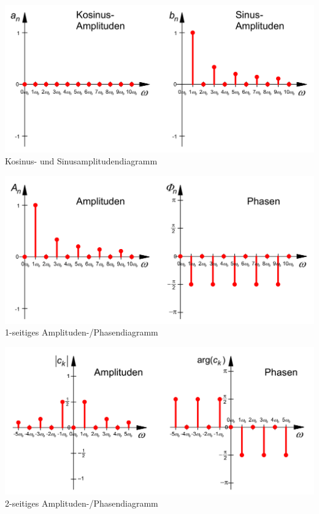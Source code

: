 \begin{minipage}{0.3\linewidth}
	\includegraphics[width=\linewidth]{./bilder/spektren_cossin.png}
	\small{Kosinus- und Sinusamplitudendiagramm}
\end{minipage}%
\hspace{0.01\linewidth}
\begin{minipage}{0.31\linewidth}
	\includegraphics[width=\linewidth]{./bilder/spektren_einseitig.png}
	\small{1-seitiges Amplituden-/Phasendiagramm}
\end{minipage}%
\hspace{0.01\linewidth}
\begin{minipage}{0.31\linewidth}
	\includegraphics[width=\linewidth]{./bilder/spektren_zweiseitig.png}
	\small{2-seitiges Amplituden-/Phasendiagramm}
\end{minipage}

